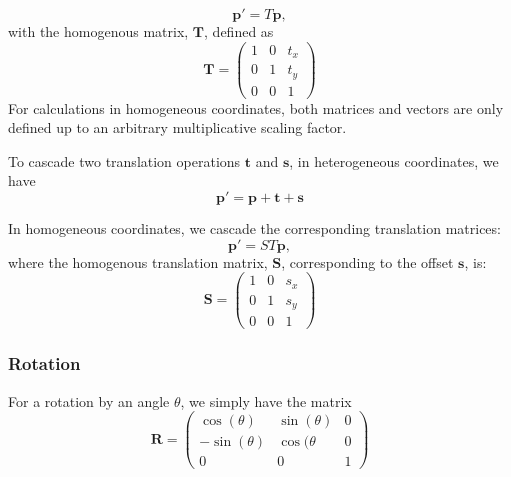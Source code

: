 \begin{equation}
    \mathbf{p}' = T \mathbf{p},
\end{equation}
with the homogenous matrix, $\mathbf{T}$, defined as
\begin{equation}
    \mathbf{T} =             \left (
    \begin{array}{ccc}
    1 & 0 & t_x \\
    0 & 1 & t_y \\
    0 & 0 & 1
    \end{array}
    \right )
\end{equation}
For calculations in homogeneous coordinates, both matrices and vectors are only defined up to an arbitrary multiplicative scaling factor.

To cascade two translation operations $\mathbf{t}$ and  $\mathbf{s} $, in heterogeneous coordinates, we have
\begin{equation}
     \mathbf{p}' = \mathbf{p} + \mathbf{t}  + \mathbf{s}    
\end{equation}

In homogeneous coordinates, we cascade the corresponding translation matrices:
\begin{equation}
     \mathbf{p}' = S T \mathbf{p},
\end{equation}
where the homogenous translation matrix, $\mathbf{S}$, corresponding to the offset $\mathbf{s}$, is:
\begin{equation}
    \mathbf{S} =             \left (
    \begin{array}{ccc}
    1 & 0 & s_x \\
    0 & 1 & s_y \\
    0 & 0 & 1
    \end{array}
    \right )
\end{equation}


\subsubsection{Rotation}
For a rotation by an angle $\theta$, we simply have the matrix
\begin{equation}
    \mathbf{R} =             \left (
    \begin{array}{ccc}
    \cos(\theta) & \sin(\theta) & 0 \\
    -\sin(\theta) & \cos(\theta & 0 \\
    0 & 0 & 1
    \end{array}
    \right )
\end{equation}


